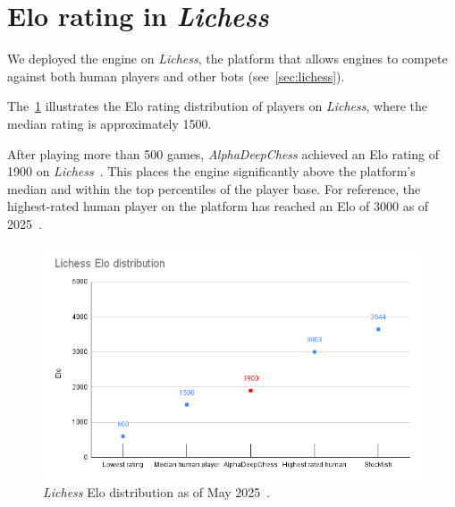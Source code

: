 \newpage

\section{Elo rating in \textit{Lichess}}

\noindent We deployed the engine on \textit{Lichess}, the platform that allows engines to compete against both human players and other bots (see~\cref{sec:lichess}).

\vspace{1em}

\noindent The~\cref{fig:eloDistribution} illustrates the Elo rating distribution of players on \textit{Lichess}, where the median rating is approximately 1500.
\vspace{1em}

\noindent After playing more than 500 games, \textit{AlphaDeepChess} achieved an Elo rating of 1900 on \textit{Lichess}~\cite{AlphaDeepChessElo}. This places the engine significantly above the platform's median and within the top percentiles of the player base. For reference, the highest-rated human player on the platform has reached an Elo of 3000 as of 2025~\cite{LichessBestPlayer}.

\begin{figure}[H]
    \centering
    \includegraphics[width=0.95\linewidth]{Imagenes/eloDistribution.png}
    \caption{\textit{Lichess} Elo distribution as of May 2025~\cite{LichessEloDistribution}.}\label{fig:eloDistribution}
\end{figure}